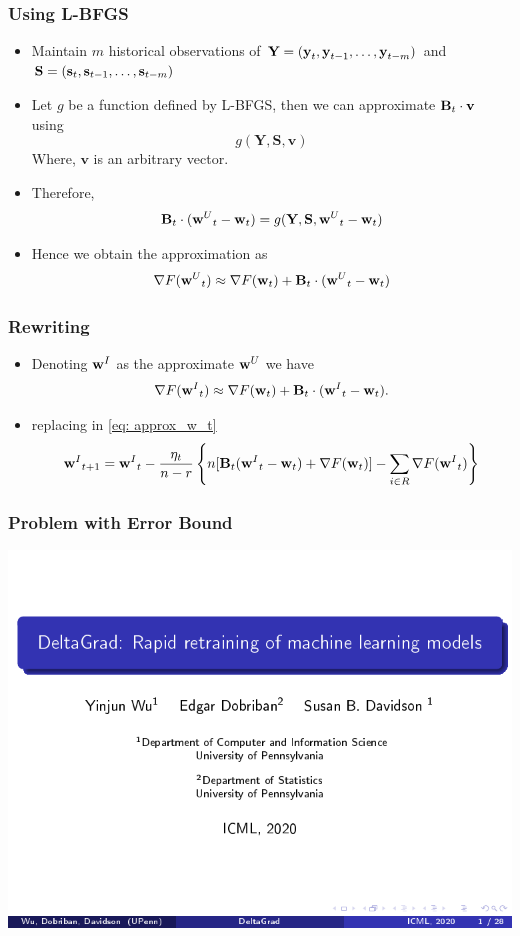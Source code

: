 \documentclass[pdf]{beamer}
\begin{document}
\begin{frame}
  \frametitle{Using L-BFGS}
  \begin{itemize}
    \item Maintain $m$ historical observations of $\textbf{Y} = (\textbf{y}_{t},\textbf{y}_{t-1},\dots,\textbf{y}_{t-m})$ and $\textbf{S} = (\textbf{s}_{t},\textbf{s}_{t-1},\dots,\textbf{s}_{t-m})$
    \item Let $g$ be a function defined by L-BFGS, then we can approximate $\textbf{B}_{t}\cdot\textbf{v}$ using 
    \[
        g(\textbf{Y},\textbf{S},\textbf{v}) 
    \]
    Where, $\textbf{v}$ is an arbitrary vector.
    \item Therefore,  
    \[ \textbf{B}_{t}\cdot({\textbf{w}^{U}}_{t}-\textbf{w}_{t}) = g(\textbf{Y},\textbf{S},{\textbf{w}^{U}}_{t}-\textbf{w}_{t}) \]
    \item Hence we obtain the approximation as 
    \[
        \nabla F({\textbf{w}^{U}}_{t}) \approx \nabla F(\textbf{w}_{t}) + \textbf{B}_{t} \cdot ({\textbf{w}^{U}}_{t}-\textbf{w}_{t}) 
    \]
  \end{itemize}
\end{frame}

\begin{frame}
  \frametitle{Rewriting}
  \begin{itemize}
    \item Denoting ${\textbf{w}^{I}}$ as the approximate ${\textbf{w}^{U}}$ we have 
    \[
      \nabla F({\textbf{w}^{I}}_{t}) \approx \nabla F(\textbf{w}_{t}) + \textbf{B}_{t} \cdot ({\textbf{w}^{I}}_{t}-\textbf{w}_{t}).
    \]
    \item replacing in \eqref{eq: approx_w_t}
    \[{\textbf{w}^{I}}_{t+1}  = {\textbf{w}^{I}}_{t} - \frac{\eta_{t}}{n-r} \left\{ n[\textbf{B}_{t}({\textbf{w}^{I}}_t - \textbf{w}_t) + \nabla F(\textbf{w}_t)] - \sum_{i\in R} \nabla F({\textbf{w}^{I}}_t)\right\}\]
  \end{itemize}
\end{frame}


\begin{frame}
  \frametitle{Problem with Error Bound}
  \includegraphics[page=43,clip,trim=0.5cm 1cm 0cm 1cm,width=\textwidth]{images/Slides.pdf}
\end{frame}
\end{document}
